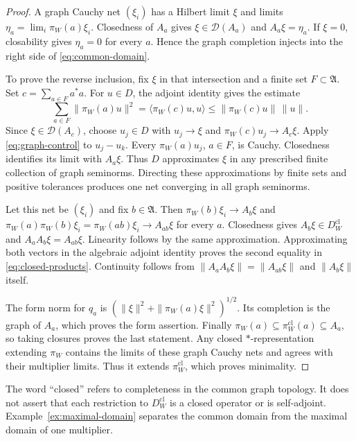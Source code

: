 \documentclass[11pt]{article}
\numberwithin{equation}{section}
\begin{document}
\begin{proof}
A graph Cauchy net $(\xi_i)$ has a Hilbert limit $\xi$ and limits
$\eta_a=\lim_i\pi_W(a)\xi_i$.  Closedness of $A_a$ gives
$\xi\in\mathcal D(A_a)$ and $A_a\xi=\eta_a$.
If $\xi=0$, closability gives $\eta_a=0$ for every $a$.
Hence the graph completion injects into the right side of
\eqref{eq:common-domain}.

To prove the reverse inclusion, fix $\xi$ in that intersection and a finite
set $F\subset\mathfrak A$.  Set $c=\sum_{a\in F}a^*a$.
For $u\in D$, the adjoint identity gives the estimate
\begin{equation}
 \sum_{a\in F}\|\pi_W(a)u\|^2
 =\langle\pi_W(c)u,u\rangle
 \leq\|\pi_W(c)u\|\,\|u\|.
 \label{eq:graph-control}
\end{equation}
Since $\xi\in\mathcal D(A_c)$, choose $u_j\in D$ with
$u_j\to\xi$ and $\pi_W(c)u_j\to A_c\xi$.
Apply \eqref{eq:graph-control} to $u_j-u_k$.
Every $\pi_W(a)u_j$, $a\in F$, is Cauchy.  Closedness identifies its
limit with $A_a\xi$.  Thus $D$ approximates $\xi$ in any prescribed
finite collection of graph seminorms.
Directing these approximations by finite sets and positive tolerances
produces one net converging in all graph seminorms.

Let this net be $(\xi_i)$ and fix $b\in\mathfrak A$.
Then $\pi_W(b)\xi_i\to A_b\xi$ and
$\pi_W(a)\pi_W(b)\xi_i=\pi_W(ab)\xi_i\to A_{ab}\xi$ for every $a$.
Closedness gives $A_b\xi\in D_W^{\mathrm{cl}}$ and
$A_aA_b\xi=A_{ab}\xi$.
Linearity follows by the same approximation.
Approximating both vectors in the algebraic adjoint identity proves
the second equality in \eqref{eq:closed-products}.
Continuity follows from
$\|A_aA_b\xi\|=\|A_{ab}\xi\|$ and $\|A_b\xi\|$ itself.

The form norm for $q_a$ is
$(\|\xi\|^2+\|\pi_W(a)\xi\|^2)^{1/2}$.
Its completion is the graph of $A_a$, which proves the form assertion.
Finally $\pi_W(a)\subseteq\pi_W^{\mathrm{cl}}(a)\subseteq A_a$,
so taking closures proves the last statement.
Any closed $*$-representation extending $\pi_W$ contains the limits of
these graph Cauchy nets and agrees with their multiplier limits.
Thus it extends $\pi_W^{\mathrm{cl}}$, which proves minimality.
\end{proof}

The word ``closed'' refers to completeness in the common graph topology.
It does not assert that each restriction to
$D_W^{\mathrm{cl}}$ is a closed operator or is self-adjoint.
Example~\ref{ex:maximal-domain} separates the common domain from the
maximal domain of one multiplier.
\end{document}
